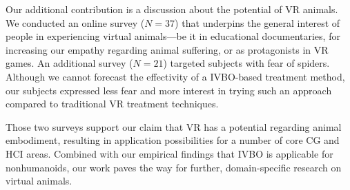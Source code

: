 Our additional contribution is a discussion about the potential of VR animals. We conducted an online survey ($N=37$) that underpins the general interest of people in experiencing virtual animals---be it in educational documentaries, for increasing our empathy regarding animal suffering, or as protagonists in VR games. An additional survey ($N=21$) targeted subjects with fear of spiders. Although we cannot forecast the effectivity of a IVBO-based treatment method, our subjects expressed less fear and more interest in trying such an approach compared to traditional VR treatment techniques.
 
Those two surveys support our claim that VR has a potential regarding animal embodiment, resulting in application possibilities for a number of core CG and HCI areas. Combined with our empirical findings that IVBO is applicable for nonhumanoids, our work paves the way for further, domain-specific research on virtual animals.

